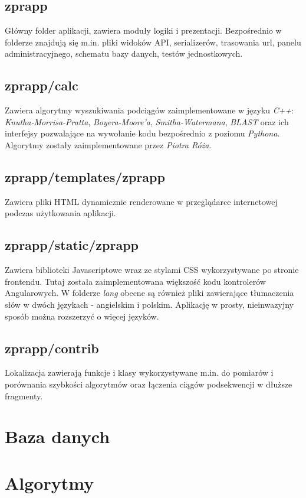 \subsection*{zprapp}
Główny folder aplikacji, zawiera moduły logiki i prezentacji.
Bezpośrednio w folderze znajdują się m.in. pliki widoków API, serializerów, trasowania url, panelu administracyjnego, schematu bazy danych, testów jednostkowych.

\subsection*{zprapp/calc}
Zawiera algorytmy wyszukiwania podciągów zaimplementowane w języku \textit{C++}: \textit{Knutha-Morrisa-Pratta}, \textit{Boyera-Moore'a}, \textit{Smitha-Watermana}, \textit{BLAST} oraz ich interfejsy pozwalające na wywołanie kodu bezpośrednio z poziomu \textit{Pythona}. Algorytmy zostały zaimplementowane przez \textit{Piotra Róża}.

\subsection*{zprapp/templates/zprapp}
Zawiera pliki HTML dynamicznie renderowane w przeglądarce internetowej podczas użytkowania aplikacji.

\subsection*{zprapp/static/zprapp}
Zawiera biblioteki Javascriptowe wraz ze stylami CSS wykorzystywane po stronie frontendu.
Tutaj została zaimplementowana większość kodu kontrolerów Angularowych.
W folderze \textit{lang} obecne są również pliki zawierające tłumaczenia słów w dwóch językach - angielskim i polskim.
Aplikację w prosty, nieinwazyjny sposób można rozszerzyć o więcej języków.

\subsection*{zprapp/contrib}
Lokalizacja zawierają funkcje i klasy wykorzystywane m.in. do pomiarów i porównania szybkości algorytmów oraz łączenia ciągów podsekwencji w dłuższe fragmenty.


\section{Baza danych}

\section{Algorytmy}

